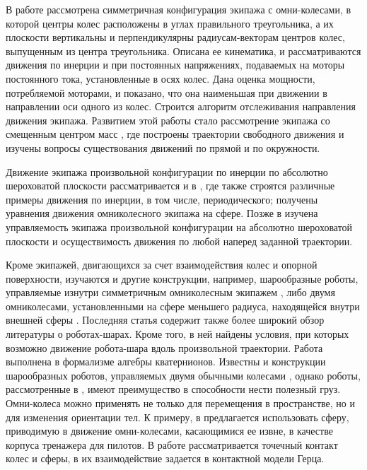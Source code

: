 В работе \cite{MartynenkoFormalskii2007,formalskii} рассмотрена симметричная конфигурация экипажа с омни-колесами, в которой центры колес расположены в углах правильного треугольника, а их плоскости вертикальны и перпендикулярны радиусам-векторам центров колес, выпущенным из центра треугольника. Описана ее кинематика, и рассматриваются движения по инерции и при постоянных напряжениях, подаваемых на моторы постоянного тока, установленные в осях колес. Дана оценка мощности, потребляемой моторами, и показано, что она наименьшая при движении в направлении оси одного из колес. Строится алгоритм отслеживания направления движения экипажа. Развитием этой работы стало рассмотрение экипажа со смещенным центром масс \cite{Martynenko2010_rus,Martynenko2010}, где построены траектории свободного движения и изучены вопросы существования движений по прямой и по окружности.

Движение экипажа произвольной конфигурации по инерции по абсолютно шероховатой плоскости рассматривается и в \cite{Borisov2011}, где также строятся различные примеры движения по инерции, в том числе, периодического; получены уравнения движения омниколесного экипажа на сфере. Позже в \cite{KilinBobykin2014} изучена управляемость экипажа произвольной конфигурации на абсолютно шероховатой плоскости и осуществимость движения по любой наперед заданной траектории.

Кроме экипажей, двигающихся за счет взаимодействия колес и опорной поверхности, изучаются и другие конструкции, например, шарообразные роботы, управляемые изнутри симметричным омниколесным экипажем \cite{Karavaev2015},
либо двумя омниколесами,  установленными на сфере меньшего радиуса, находящейся внутри внешней сферы \cite{Ivanov2015a}. Последняя статья содержит также более широкий обзор литературы о роботах-шарах. Кроме того, в ней найдены условия, при которых возможно движение робота-шара вдоль произвольной траектории. Работа выполнена в формализме алгебры кватернионов. Известны и конструкции шарообразных роботов, управляемых двумя обычными колесами \cite{Zhan2011}, однако роботы, рассмотренные в \cite{Ivanov2015a}, имеют преимущество в способности нести полезный груз. Омни-колеса можно применять не только для перемещения в пространстве, но и для изменения ориентации тел. К примеру, в \cite{Weiss2015,Plumpton2014} предлагается использовать сферу, приводимую в движение омни-колесами, касающимися ее извне, в качестве корпуса тренажера для пилотов. В работе \cite{Plumpton2014} рассматривается точечный контакт колес и сферы, в \cite{Weiss2015} их взаимодействие задается в контактной модели Герца.

